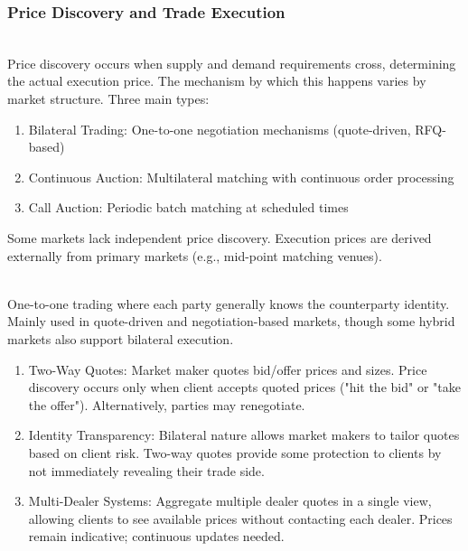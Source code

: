 \subsubsection{Price Discovery and Trade Execution}

\begin{remark} \\
Price discovery occurs when supply and demand requirements cross, determining the actual execution price. The mechanism by which this happens varies by market structure. Three main types:
\begin{enumerate}[label=\roman*.]
\setlength{\itemsep}{0pt}
\item Bilateral Trading: One-to-one negotiation mechanisms (quote-driven, RFQ-based)
\item Continuous Auction: Multilateral matching with continuous order processing
\item Call Auction: Periodic batch matching at scheduled times
\end{enumerate}
Some markets lack independent price discovery. Execution prices are derived externally from primary markets (e.g., mid-point matching venues).
\end{remark}

\begin{definition} \\
One-to-one trading where each party generally knows the counterparty identity. Mainly used in quote-driven and negotiation-based markets, though some hybrid markets also support bilateral execution.
\begin{enumerate}[label=\roman*.]
\setlength{\itemsep}{0pt}
\item Two-Way Quotes: Market maker quotes bid/offer prices and sizes. Price discovery occurs only when client accepts quoted prices ("hit the bid" or "take the offer"). Alternatively, parties may renegotiate.
\item Identity Transparency: Bilateral nature allows market makers to tailor quotes based on client risk. Two-way quotes provide some protection to clients by not immediately revealing their trade side.
\item Multi-Dealer Systems: Aggregate multiple dealer quotes in a single view, allowing clients to see available prices without contacting each dealer. Prices remain indicative; continuous updates needed.
\end{enumerate}
\end{definition}

